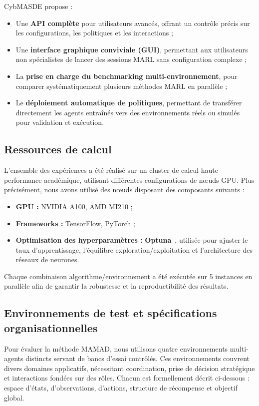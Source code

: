 \documentclass[pdflatex,sn-mathphys-num]{sn-jnl}%
\theoremstyle{thmstyleone}%
\theoremstyle{thmstyletwo}%
\theoremstyle{thmstylethree}%
\begin{document}
CybMASDE propose :
\begin{itemize}
    \item Une \textbf{API complète} pour utilisateurs avancés, offrant un contrôle précis sur les configurations, les politiques et les interactions ;
    \item Une \textbf{interface graphique conviviale (GUI)}, permettant aux utilisateurs non spécialistes de lancer des sessions MARL sans configuration complexe ;
    \item La \textbf{prise en charge du benchmarking multi-environnement}, pour comparer systématiquement plusieurs méthodes MARL en parallèle ;
    \item Le \textbf{déploiement automatique de politiques}, permettant de transférer directement les agents entraînés vers des environnements réels ou simulés pour validation et exécution.
\end{itemize}



\subsection{Ressources de calcul}

L'ensemble des expériences a été réalisé sur un cluster de calcul haute performance académique, utilisant différentes configurations de nœuds GPU. Plus précisément, nous avons utilisé des nœuds disposant des composants suivants :
\begin{itemize}
    \item \textbf{GPU :} NVIDIA A100, AMD MI210 ;
    \item \textbf{Frameworks :} TensorFlow, PyTorch ;
    \item \textbf{Optimisation des hyperparamètres :} \textbf{Optuna}~\cite{akiba2019optuna}, utilisée pour ajuster le taux d'apprentissage, l'équilibre exploration/exploitation et l'architecture des réseaux de neurones.
\end{itemize}

Chaque combinaison algorithme/environnement a été exécutée sur 5 instances en parallèle afin de garantir la robustesse et la reproductibilité des résultats.

\subsection{Environnements de test et spécifications organisationnelles}

Pour évaluer la méthode MAMAD, nous utilisons quatre environnements multi-agents distincts servant de bancs d'essai contrôlés. Ces environnements couvrent divers domaines applicatifs, nécessitant coordination, prise de décision stratégique et interactions fondées sur des rôles. Chacun est formellement décrit ci-dessous : espace d'états, d'observations, d'actions, structure de récompense et objectif global.
\end{document}
